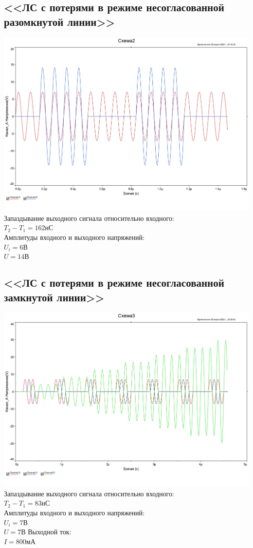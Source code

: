 \documentclass[11pt]{article}
\begin{document}
\subsection{<<ЛС с потерями в режиме несогласованной разомкнутой линии>>}
\includegraphics[width=1\linewidth]{2/2osc.jpg}
Запаздывание выходного сигнала относительно входного:\\
$T_2 - T_1 = 162$нС\\
Амплитуды входного и выходного напряжений:\\
$U_i = 6$В\\
$U = 14$В
\subsection{<<ЛС с потерями в режиме несогласованной замкнутой линии>>}
\includegraphics[width=1\linewidth]{3/3osc.jpg}
Запаздывание выходного сигнала относительно входного:\\
$T_2 - T_1 = 83$нС\\
Амплитуды входного и выходного напряжений:\\
$U_i = 7$В\\
$U = 7$В
Выходной ток:\\
$I = 800$мА\\
\end{document}
